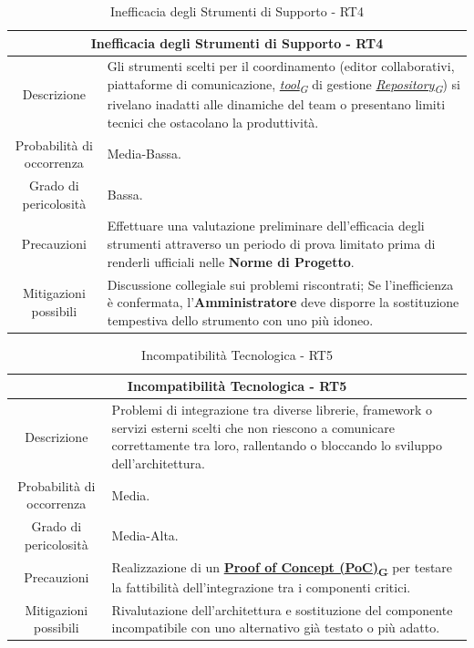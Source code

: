 \documentclass[12pt, a4paper]{article}
\newcommand{\urlglossario}{https://skynetunigroup.github.io/Code_Guardian/Documentazione/RTB/glossario_v1.0.0.pdf} %
\newcommand{\glo}[2]{\href{\urlglossario\#nameddest=#2}{#1\textsubscript{G}}}
\begin{document}
\begin{table}[H]
    \centering
    \renewcommand{\arraystretch}{1.3}
    \begin{tabularx}{\textwidth}{|c|X|}
        \hline
        \multicolumn{2}{|c|}{\textbf{Inefficacia degli Strumenti di Supporto - RT4}} \\ \hline
        Descrizione &
        Gli strumenti scelti 
per il coordinamento (editor collaborativi,
        piattaforme di comunicazione, \textit{\glo{tool}{tool}} di gestione \textit{\glo{Repository}{repository}}) si rivelano
        inadatti alle dinamiche del team o presentano limiti tecnici che
        ostacolano la produttività.
\\ \hline
        Probabilità di occorrenza & Media-Bassa.
\\ \hline
        Grado di pericolosità & Bassa.
\\ \hline
        Precauzioni &
        Effettuare una valutazione preliminare dell'efficacia
        degli strumenti attraverso un periodo di prova limitato prima di
        renderli ufficiali nelle \textbf{Norme di Progetto}.
\\ \hline
        Mitigazioni possibili &
        Discussione collegiale sui problemi riscontrati; Se
        l'inefficienza è confermata, l'\textbf{Amministratore} deve
        disporre la sostituzione tempestiva dello strumento con uno più idoneo.\\ \hline
    \end{tabularx}
    \caption{Inefficacia degli Strumenti di Supporto - RT4}
\end{table}

\begin{table}[H]
    \centering
    \renewcommand{\arraystretch}{1.3}
    \begin{tabularx}{\textwidth}{|c|X|}
        \hline
        \multicolumn{2}{|c|}{\textbf{Incompatibilità Tecnologica - RT5}} \\ \hline
        Descrizione &
        Problemi di integrazione tra diverse librerie, framework o servizi
        esterni scelti che non riescono a comunicare correttamente tra loro,
        rallentando o bloccando lo sviluppo dell'architettura.
\\ \hline
        Probabilità di occorrenza & Media.
\\ \hline
        Grado di pericolosità & Media-Alta.
\\ \hline
        Precauzioni &
        Realizzazione di un \textbf{\glo{Proof of Concept (PoC)}{poc}} per testare la fattibilità dell'integrazione tra i componenti critici.
\\ \hline
        Mitigazioni possibili &
        Rivalutazione dell'architettura e sostituzione del componente incompatibile con uno alternativo già testato o più adatto.\\ \hline
    \end{tabularx}
    \caption{Incompatibilità Tecnologica - RT5}
\end{table}
\end{document}
